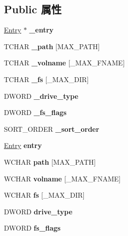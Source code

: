\subsection*{Public 属性}
\begin{DoxyCompactItemize}
\item 
\mbox{\label{struct_root_ac2882ebe9228456ca3978d3727fc7571}} 
\hyperlink{struct_entry}{Entry} $\ast$ {\bfseries \+\_\+entry}
\item 
\mbox{\label{struct_root_ae8557b5230c6bc34495a593a5665b71f}} 
T\+C\+H\+AR {\bfseries \+\_\+path} \mbox{[}M\+A\+X\+\_\+\+P\+A\+TH\mbox{]}
\item 
\mbox{\label{struct_root_aaaf54cf8541357e1c11bcd5625b668d8}} 
T\+C\+H\+AR {\bfseries \+\_\+volname} \mbox{[}\+\_\+\+M\+A\+X\+\_\+\+F\+N\+A\+ME\mbox{]}
\item 
\mbox{\label{struct_root_a872a9c739057653517635d5ce5934151}} 
T\+C\+H\+AR {\bfseries \+\_\+fs} \mbox{[}\+\_\+\+M\+A\+X\+\_\+\+D\+IR\mbox{]}
\item 
\mbox{\label{struct_root_a8dbe0bf973ac90f78cd9ec67d0c706ac}} 
D\+W\+O\+RD {\bfseries \+\_\+drive\+\_\+type}
\item 
\mbox{\label{struct_root_a25926f43d526b7336c95b13c68718501}} 
D\+W\+O\+RD {\bfseries \+\_\+fs\+\_\+flags}
\item 
\mbox{\label{struct_root_aa3b0917feb9c24412ddb797037f65669}} 
S\+O\+R\+T\+\_\+\+O\+R\+D\+ER {\bfseries \+\_\+sort\+\_\+order}
\item 
\mbox{\label{struct_root_a3db26392d540ea4707e2f29259242ce6}} 
\hyperlink{struct_entry}{Entry} {\bfseries entry}
\item 
\mbox{\label{struct_root_a9f8d3e685496caafb899715b575ed0d8}} 
W\+C\+H\+AR {\bfseries path} \mbox{[}M\+A\+X\+\_\+\+P\+A\+TH\mbox{]}
\item 
\mbox{\label{struct_root_af20d4f8f5317e4a209aa4715d006a937}} 
W\+C\+H\+AR {\bfseries volname} \mbox{[}\+\_\+\+M\+A\+X\+\_\+\+F\+N\+A\+ME\mbox{]}
\item 
\mbox{\label{struct_root_a0225a0001b76df5e4853ed00b70d72df}} 
W\+C\+H\+AR {\bfseries fs} \mbox{[}\+\_\+\+M\+A\+X\+\_\+\+D\+IR\mbox{]}
\item 
\mbox{\label{struct_root_a200afc485a64dfe30c8768dcbfd683c0}} 
D\+W\+O\+RD {\bfseries drive\+\_\+type}
\item 
\mbox{\label{struct_root_a3311e1e39e4fac3800d7173373fbcad6}} 
D\+W\+O\+RD {\bfseries fs\+\_\+flags}
\end{DoxyCompactItemize}


